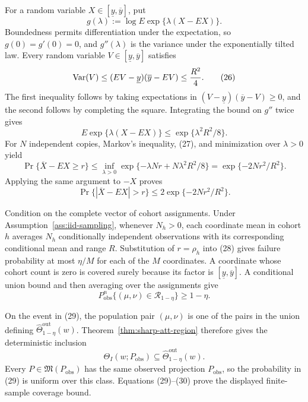 For a random variable \(X\in[\underline y,\overline y]\), put
\[
 g(\lambda):=\log E\exp\{\lambda(X-EX)\}.
\]
Boundedness permits differentiation under the expectation, so \(g(0)=g'(0)=0\), and \(g''(\lambda)\) is the variance under the exponentially tilted law.  Every random variable \(V\in[\underline y,\overline y]\) satisfies
\[
 \operatorname{Var}(V)
 \le(EV-\underline y)(\overline y-EV)
 \le {R^2\over4}.
\tag{26}
\]
The first inequality follows by taking expectations in \((V-\underline y)(\overline y-V)\ge0\), and the second follows by completing the square.  Integrating the bound on \(g''\) twice gives
\[
 E\exp\{\lambda(X-EX)\}\le\exp\{\lambda^2R^2/8\}.
\tag{27}
\]
For \(N\) independent copies, Markov's inequality, (27), and minimization over \(\lambda>0\) yield
\[
 \Pr\{\overline X-EX\ge r\}
 \le\inf_{\lambda>0}
 \exp\{-\lambda Nr+N\lambda^2R^2/8\}
 =\exp\{-2Nr^2/R^2\}.
\]
Applying the same argument to \(-X\) proves
\[
 \Pr\{|\overline X-EX|>r\}
 \le2\exp\{-2Nr^2/R^2\}.
\tag{28}
\]

Condition on the complete vector of cohort assignments.  Under Assumption~\ref{ass:iid-sampling}, whenever \(N_h>0\), each coordinate mean in cohort \(h\) averages \(N_h\) conditionally independent observations with its corresponding conditional mean and range \(R\).  Substitution of \(r=\rho_h\) into (28) gives failure probability at most \(\eta/M\) for each of the \(M\) coordinates.  A coordinate whose cohort count is zero is covered surely because its factor is \([\underline y,\overline y]\).  A conditional union bound and then averaging over the assignments give
\[
 P_{\mathrm{obs}}^n\{(\mu,\nu)\in\mathcal R_{1-\eta}\}
 \ge1-\eta.
\tag{29}
\]

On the event in (29), the population pair \((\mu,\nu)\) is one of the pairs in the union defining \(\widehat\Theta^{\mathrm{out}}_{1-\eta}(w)\).  Theorem~\ref{thm:sharp-att-region} therefore gives the deterministic inclusion
\[
 \Theta_I(w;P_{\mathrm{obs}})
 \subseteq\widehat\Theta^{\mathrm{out}}_{1-\eta}(w).
\tag{30}
\]
Every \(P\in\mathfrak M(P_{\mathrm{obs}})\) has the same observed projection \(P_{\mathrm{obs}}\), so the probability in (29) is uniform over this class.  Equations (29)--(30) prove the displayed finite-sample coverage bound.

